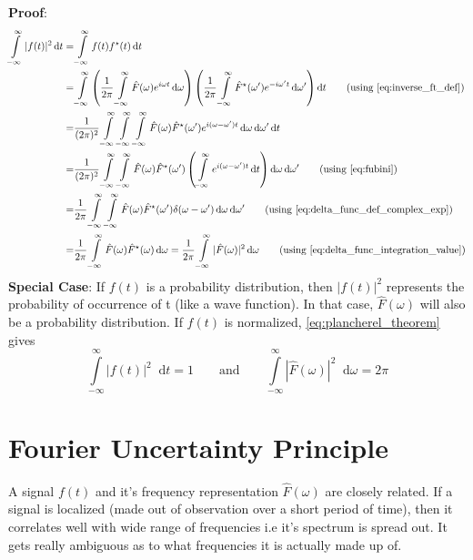 \documentclass[11pt, a4paper]{article}
\let\oldsection\section
\renewcommand{\section}{%
	\setcounter{equation}{0}%
	\oldsection%
}
\newcommand{\eqrefnp}[1]{\textup{\ref{#1}}}  %
\newcommand{\primed}[1]{#1^{\prime}}
\newcommand{\omegap}{\primed{\omega}}	%
\newcommand{\diff}{\mathop{}\!\mathrm{d}}
\newcommand{\dt}{\diff t}
\newcommand{\domega}{\diff \omega}
\newcommand{\domegap}{\diff \omegap}
\newcommand{\dint}[2]{\int \limits_{#1}^{#2}}  %
\newcommand{\intinfty}{\dint{-\infty}{\infty}}	%
\newcommand{\iintinfty}{\intinfty \intinfty}	%
\newcommand{\iiintinfty}{\intinfty \intinfty \intinfty}	%
\begin{document}
	\vspace{4pt}
	\noindent
	\textbf{Proof}: 
	\begin{align*}
		\intinfty |f(t)|^{2} \dt 
		= & \intinfty f(t)f^{\star}(t) \dt \\
		= & \intinfty \left(\frac{1}{2 \pi} \intinfty \hat{F}(\omega) e^{i \omega t} \domega \right) \left(\frac{1}{2 \pi} \intinfty \hat{F}^{\star}(\omegap) e^{-i \omegap t} \domegap \right) \dt \tag{using \eqrefnp{eq:inverse_ft_def}} \\
		= & \frac{1}{(2 \pi)^2} \iiintinfty \hat{F}(\omega) \hat{F}^{\star}(\omegap) e^{i (\omega - \omegap) t} \domega \domegap \dt \\
		= & \frac{1}{(2 \pi)^2} \iintinfty \hat{F}(\omega) \hat{F}^{\star}(\omegap) \left( \intinfty e^{i (\omega - \omegap) t} \dt \right) \domega \domegap \tag{using \eqrefnp{eq:fubini}} \\
		= & \frac{1}{2 \pi} \iintinfty \hat{F}(\omega) \hat{F}^{\star}(\omegap) \delta(\omega - \omegap) \domega \domegap \tag{using \eqrefnp{eq:delta_func_def_complex_exp}} \\
		= & \frac{1}{2 \pi} \intinfty \hat{F}(\omega) \hat{F}^{\star}(\omega) \domega 
		= \frac{1}{2 \pi} \intinfty |\hat{F}(\omega)|^{2} \domega  \tag{using \eqrefnp{eq:delta_func_integration_value}} \\
	\end{align*}
	\noindent
	\textbf{Special Case}: If $f(t)$ is a probability distribution, then $|f(t)|^{2}$ represents the probability of occurrence of t (like a wave function). In that case, $\hat{F}(\omega)$ will also be a probability distribution. If $f(t)$ is normalized, \eqref{eq:plancherel_theorem} gives
	\begin{equation}\label{eq:plancherel_normal_func_and_spectrum}
		\intinfty |f(t)|^{2} \dt = 1 \qquad \text{and} \qquad \intinfty |\hat{F}(\omega)|^{2} \domega = 2 \pi
	\end{equation}
	
	\section{Fourier Uncertainty Principle}\label{sec:fourier_uncertainity_principle}
	A signal $f(t)$ and it's frequency representation $\hat{F}(\omega)$ are closely related. If a signal is localized (made out of observation over a short period of time), then it correlates well with wide range of frequencies i.e it's spectrum is spread out. It gets really ambiguous as to what frequencies it is actually made up of.
	
\end{document}
